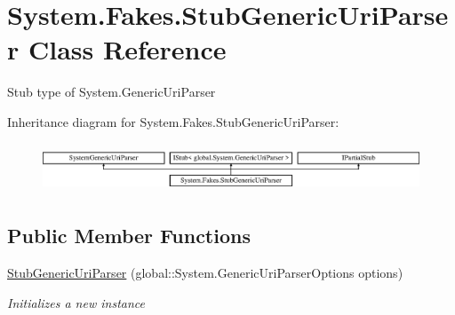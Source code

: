 \hypertarget{class_system_1_1_fakes_1_1_stub_generic_uri_parser}{\section{System.\-Fakes.\-Stub\-Generic\-Uri\-Parser Class Reference}
\label{class_system_1_1_fakes_1_1_stub_generic_uri_parser}
}


Stub type of System.\-Generic\-Uri\-Parser 


Inheritance diagram for System.\-Fakes.\-Stub\-Generic\-Uri\-Parser\-:\begin{figure}[H]
\begin{center}
\leavevmode
\includegraphics[height=1.475626cm]{class_system_1_1_fakes_1_1_stub_generic_uri_parser}
\end{center}
\end{figure}
\subsection*{Public Member Functions}
\begin{DoxyCompactItemize}
\item 
\hyperlink{class_system_1_1_fakes_1_1_stub_generic_uri_parser_afa05ee02c0a4e8862ae0125bb62d60f8}{Stub\-Generic\-Uri\-Parser} (global\-::\-System.\-Generic\-Uri\-Parser\-Options options)
\begin{DoxyCompactList}\small\item\em Initializes a new instance\end{DoxyCompactList}\end{DoxyCompactItemize}
